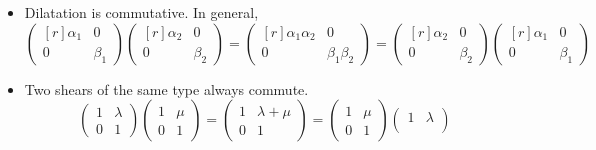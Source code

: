 \documentclass[fleqn,a4paper,11pt]{article}
\begin{document}
\begin{enumerate}[label=\textbf{\arabic*.}]
\begin{enumerate}[label=(\alph*)]
\begin{itemize}
\begin{itemize}
         \item
          Dilatation is commutative. In general,
          \begin{equation*}
           \begin{pmatrix*}[r]
            \alpha_1 & 0 \\
            0 & \beta_1
           \end{pmatrix*}
           \begin{pmatrix*}[r]
            \alpha_2 & 0 \\
            0 & \beta_2
           \end{pmatrix*}
           =
           \begin{pmatrix*}[r]
            \alpha_1 \alpha_2 & 0 \\
            0 & \beta_1 \beta_2
           \end{pmatrix*}
           =
           \begin{pmatrix*}[r]
            \alpha_2 & 0 \\
            0 & \beta_2
           \end{pmatrix*}
           \begin{pmatrix*}[r]
            \alpha_1 & 0 \\
            0 & \beta_1
           \end{pmatrix*}
          \end{equation*}
         \item
          Two shears of the same type always commute.
          \begin{equation*}
           \begin{pmatrix*}
            1 & \lambda \\
            0 & 1
           \end{pmatrix*}
           \begin{pmatrix*}
            1 & \mu \\
            0 & 1
           \end{pmatrix*}
           =
           \begin{pmatrix*}
            1 & \lambda + \mu \\
            0 & 1
           \end{pmatrix*}
           =
           \begin{pmatrix*}
            1 & \mu \\
            0 & 1
           \end{pmatrix*}
           \begin{pmatrix*}
            1 & \lambda \\

\end{pmatrix*}
\end{equation*}
\end{itemize}
\end{itemize}
\end{enumerate}
\end{enumerate}
\end{document}
